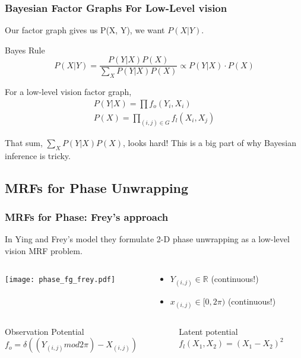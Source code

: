 \documentclass[compress]{beamer}
\begin{document}
\begin{frame}
\frametitle{Bayesian Factor Graphs For Low-Level vision}
Our factor graph gives us P(X, Y), we want $P(X | Y)$. 

\begin{block}{Bayes Rule} 
  \begin{equation*}
    P(X | Y ) = \frac{P(Y | X) P(X)}{\sum_XP(Y|X)P(X)} \propto P(Y | X) \cdot  P(X)
  \end{equation*}
\end{block}

For a low-level vision factor graph,
\begin{eqnarray*}
  P(Y | X) =  \prod f_o(Y_i,  X_i) \\
  P(X) = \prod_{(i, j) \in G} f_l(X_i, X_j)
\end{eqnarray*}

That sum, $\sum_XP(Y|X)P(X)$, looks hard! This is a big part of why 
Bayesian inference is tricky. 

\end{frame}

\subsection{MRFs for Phase Unwrapping}

\begin{frame} 
  \frametitle{MRFs for Phase: Frey's approach}
  In Ying and Frey's model \cite{lei_ying_unwrapping_2006} they formulate 2-D phase
  unwrapping as a low-level vision MRF problem. 
  
  \begin{columns}
    \begin{column}{5cm}
      \texttt{[image: phase\_fg\_frey.pdf]}
    \end{column}
    \begin{column}{5cm}
      \begin{itemize}
      \item $Y_{(i, j)} \in \mathbb{R}$ (continuous!) 
      \item $x_{(i, j)} \in [0, 2\pi)$ (continuous!) 
      \end{itemize}
    \end{column}
  \end{columns}
  
  
  \begin{columns}
    \begin{column}{5cm}
      \begin{block}{Observation Potential}
        $f_o = \delta ((Y_{(i, j)} mod 2\pi) - X_{(i, j)})$
      \end{block}
    \end{column}

    \begin{column}{5cm}
      \begin{block}{Latent potential} 
        $f_l(X_1, X_2) = (X_1 - X_2)^2$
      \end{block}
    \end{column}
    
  \end{columns}
  
\end{frame}
\end{document}
